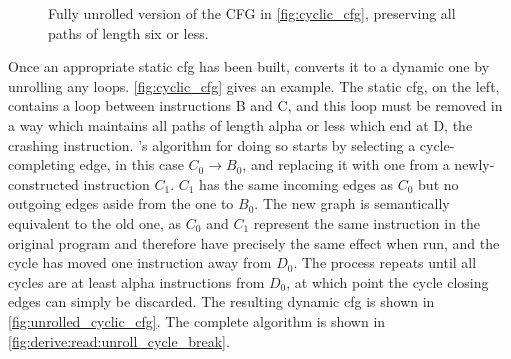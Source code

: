 \begin{wrapfigure}{r}{3.9cm}
\vspace{-14pt}
\begin{figgure}
\vspace{-2pt}
\caption{Fully unrolled version of the CFG in
  \autoref{fig:cyclic_cfg}, preserving all paths of length six or
  less.}
\label{fig:unrolled_cyclic_cfg}
\vspace{-4pt}
\end{figgure}
\vspace{-13pt}
\end{wrapfigure}
Once an appropriate \gls{static cfg} has been built, {\technique}
converts it to a dynamic one by unrolling any loops.
\autoref{fig:cyclic_cfg} gives an example.  The \gls{static cfg}, on
the left, contains a loop between instructions B and C, and this loop
must be removed in a way which maintains all paths of length
\gls{alpha} or less which end at D, the \gls{crashing instruction}.
    {\Technique}'s algorithm for doing so starts by selecting a
    cycle-completing edge, in this case $C_0{\rightarrow}B_0$, and
    replacing it with one from a newly-constructed instruction $C_1$.
    $C_1$ has the same incoming edges as $C_0$ but no outgoing edges
    aside from the one to $B_0$.  The new graph is semantically
    equivalent to the old one, as $C_0$ and $C_1$ represent the same
    instruction in the original program and therefore have precisely
    the same effect when run, and the cycle has moved one instruction
    away from $D_0$.  The process repeats until all cycles are at
    least \gls{alpha} instructions from $D_0$, at which point the
    cycle closing edges can simply be discarded.  The resulting
    \gls{dynamic cfg} is shown in \autoref{fig:unrolled_cyclic_cfg}.
    The complete algorithm is shown in
    \autoref{fig:derive:read:unroll_cycle_break}.

